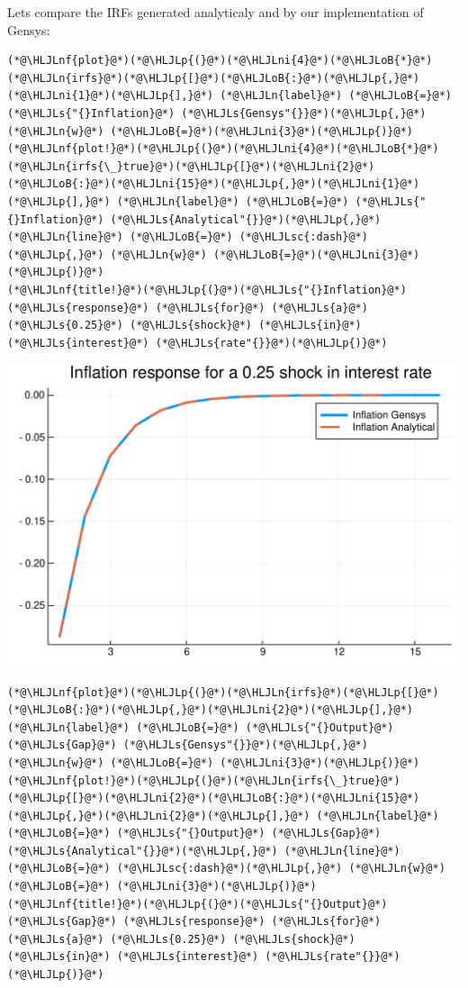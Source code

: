 \documentclass[12pt,a4paper]{article}
\newcommand{\HLJLn}[1]{#1}
\newcommand{\HLJLnf}[1]{\textcolor[RGB]{66,102,213}{#1}}
\newcommand{\HLJLs}[1]{\textcolor[RGB]{201,61,57}{#1}}
\newcommand{\HLJLsc}[1]{\textcolor[RGB]{201,61,57}{#1}}
\newcommand{\HLJLni}[1]{\textcolor[RGB]{59,151,46}{#1}}
\newcommand{\HLJLoB}[1]{\textcolor[RGB]{102,102,102}{\textbf{#1}}}
\newcommand{\HLJLp}[1]{#1}
\begin{document}
Lets compare the IRFs generated analyticaly and by our implementation of Gensys:


\begin{lstlisting}
(*@\HLJLnf{plot}@*)(*@\HLJLp{(}@*)(*@\HLJLni{4}@*)(*@\HLJLoB{*}@*)(*@\HLJLn{irfs}@*)(*@\HLJLp{[}@*)(*@\HLJLoB{:}@*)(*@\HLJLp{,}@*)(*@\HLJLni{1}@*)(*@\HLJLp{],}@*) (*@\HLJLn{label}@*) (*@\HLJLoB{=}@*) (*@\HLJLs{"{}Inflation}@*) (*@\HLJLs{Gensys"{}}@*)(*@\HLJLp{,}@*) (*@\HLJLn{w}@*) (*@\HLJLoB{=}@*)(*@\HLJLni{3}@*)(*@\HLJLp{)}@*)
(*@\HLJLnf{plot!}@*)(*@\HLJLp{(}@*)(*@\HLJLni{4}@*)(*@\HLJLoB{*}@*)(*@\HLJLn{irfs{\_}true}@*)(*@\HLJLp{[}@*)(*@\HLJLni{2}@*)(*@\HLJLoB{:}@*)(*@\HLJLni{15}@*)(*@\HLJLp{,}@*)(*@\HLJLni{1}@*)(*@\HLJLp{],}@*) (*@\HLJLn{label}@*) (*@\HLJLoB{=}@*) (*@\HLJLs{"{}Inflation}@*) (*@\HLJLs{Analytical"{}}@*)(*@\HLJLp{,}@*) (*@\HLJLn{line}@*) (*@\HLJLoB{=}@*) (*@\HLJLsc{:dash}@*)(*@\HLJLp{,}@*) (*@\HLJLn{w}@*) (*@\HLJLoB{=}@*)(*@\HLJLni{3}@*)(*@\HLJLp{)}@*)
(*@\HLJLnf{title!}@*)(*@\HLJLp{(}@*)(*@\HLJLs{"{}Inflation}@*) (*@\HLJLs{response}@*) (*@\HLJLs{for}@*) (*@\HLJLs{a}@*) (*@\HLJLs{0.25}@*) (*@\HLJLs{shock}@*) (*@\HLJLs{in}@*) (*@\HLJLs{interest}@*) (*@\HLJLs{rate"{}}@*)(*@\HLJLp{)}@*)
\end{lstlisting}

\includegraphics[width=\linewidth]{figures/gensys_11_1.pdf}

\begin{lstlisting}
(*@\HLJLnf{plot}@*)(*@\HLJLp{(}@*)(*@\HLJLn{irfs}@*)(*@\HLJLp{[}@*)(*@\HLJLoB{:}@*)(*@\HLJLp{,}@*)(*@\HLJLni{2}@*)(*@\HLJLp{],}@*) (*@\HLJLn{label}@*) (*@\HLJLoB{=}@*) (*@\HLJLs{"{}Output}@*) (*@\HLJLs{Gap}@*) (*@\HLJLs{Gensys"{}}@*)(*@\HLJLp{,}@*) (*@\HLJLn{w}@*) (*@\HLJLoB{=}@*) (*@\HLJLni{3}@*)(*@\HLJLp{)}@*)
(*@\HLJLnf{plot!}@*)(*@\HLJLp{(}@*)(*@\HLJLn{irfs{\_}true}@*)(*@\HLJLp{[}@*)(*@\HLJLni{2}@*)(*@\HLJLoB{:}@*)(*@\HLJLni{15}@*)(*@\HLJLp{,}@*)(*@\HLJLni{2}@*)(*@\HLJLp{],}@*) (*@\HLJLn{label}@*) (*@\HLJLoB{=}@*) (*@\HLJLs{"{}Output}@*) (*@\HLJLs{Gap}@*) (*@\HLJLs{Analytical"{}}@*)(*@\HLJLp{,}@*) (*@\HLJLn{line}@*) (*@\HLJLoB{=}@*) (*@\HLJLsc{:dash}@*)(*@\HLJLp{,}@*) (*@\HLJLn{w}@*) (*@\HLJLoB{=}@*) (*@\HLJLni{3}@*)(*@\HLJLp{)}@*)
(*@\HLJLnf{title!}@*)(*@\HLJLp{(}@*)(*@\HLJLs{"{}Output}@*) (*@\HLJLs{Gap}@*) (*@\HLJLs{response}@*) (*@\HLJLs{for}@*) (*@\HLJLs{a}@*) (*@\HLJLs{0.25}@*) (*@\HLJLs{shock}@*) (*@\HLJLs{in}@*) (*@\HLJLs{interest}@*) (*@\HLJLs{rate"{}}@*)(*@\HLJLp{)}@*)
\end{lstlisting}
\end{document}
